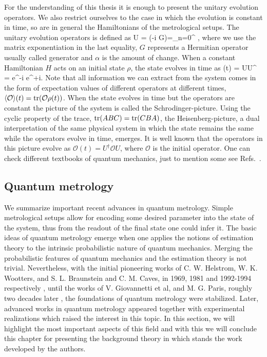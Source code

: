 For the understanding of this thesis it is enough to present the unitary evolution operators.
We also restrict ourselves to the case in which the evolution is constant in time, so are in general the Hamiltonians of the metrological setups.
The unitary evolution operators is defined as
\be
  U = \exp(-i \alpha G)=\sum_{n=0}^{\infty} ,
\ee
where we use the matrix exponentiation in the last equality, $G$ represents a Hermitian operator usually called generator and $\alpha$ is the amount of change.
When a constant Hamiltonian $H$ acts on an initial state $\rho$, the state evolves in time as
\be
  \rho(t) = U\rho U^{\dagger} = e^{-i} \rho e^{+i}.
\ee
Note that all information we can extract from the system comes in the form of expectation values of different operators at different times, $\langle{\mathcal{O}}\rangle(t) = \operatorname{tr}(\mathcal{O}\rho(t))$.
When the state evolves in time but the operators are constant the picture of the system is called the Schrodinger-picture.
Using the cyclic property of the trace, $\operatorname{tr}(ABC) = \operatorname{tr}(CBA)$, the Heisenberg-picture, a dual interpretation of the same physical system in which the state remains the same while the operators evolve in time, emerges.
It is well known that the operators in this picture evolve as $\mathcal{O}(t) = U^{\dagger} \mathcal{O} U$, where $\mathcal{O}$ is the initial operator.
One can check different textbooks of quantum mechanics, just to mention some see Refs.~\cite{Cohen-Tannoudji1977, Sakurai2014}.

\subsection{Quantum metrology}
\label{sec:bg-quantum-metrology}

We summarize important recent advances in quantum metrology.
Simple metrological setups allow for encoding some desired parameter into the state of the system, thus from the readout of the final state one could infer it.
The basic ideas of quantum metrology emerge when one applies the notions of estimation theory to the intrinsic probabilistic nature of quantum mechanics.
Merging the probabilistic features of quantum mechanics and the estimation theory is not trivial.
Nevertheless, with the initial pioneering works of C. W. Helstrom, W. K. Wootters, and S. L. Braunstein and C. M. Caves, in 1969, 1981 and 1992-1994 respectively \cite{Helstrom1969, Wootters1981, Braunstein1992, Braunstein1994}, until the works of V. Giovannetti et al, and M. G. Paris, roughly two decades later \cite{Giovannetti2004, Paris2009}, the foundations of quantum metrology were stabilized.
Later, advanced works in quantum metrology appeared \cite{Hyllus2010, Hyllus2012, Hyllus2010a, Kolodynski2010, Kolodynski2013}
together with experimental realizations \cite{Behbood2013, Koschorreck2011, Luecke2011} which raised the interest in this topic.
In this section, we will highlight the most important aspects of this field and with this we will conclude this chapter for presenting the background theory in which stands the work developed by the authors.

